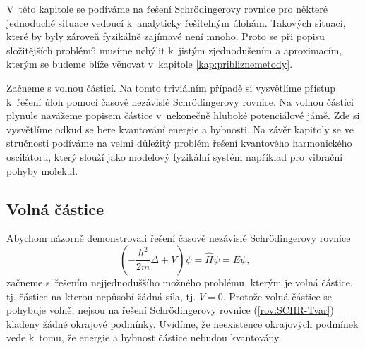 V~této kapitole se podíváme na řešení Schrödingerovy rovnice pro některé jednoduché situace vedoucí k~analyticky řešitelným úlohám. Takových situací, které by byly zároveň fyzikálně zajímavé není mnoho. Proto se při popisu složitějších problémů musíme uchýlit k~jistým zjednodušením a aproximacím, kterým se budeme blíže věnovat v~kapitole \ref{kap:pribliznemetody}.

Začneme s volnou částicí. Na tomto triviálním případě si vysvětlíme přístup k~řešení úloh pomocí časově nezávislé Schrödingerovy rovnice. Na volnou částici plynule navážeme popisem částice v~nekonečně hluboké potenciálové jámě. Zde si vysvětlíme odkud se bere kvantování energie a hybnosti. Na závěr kapitoly se ve stručnosti podíváme na velmi důležitý problém řešení kvantového harmonického oscilátoru, který slouží jako modelový fyzikální systém například pro vibrační pohyby molekul.

\subsection{Volná částice}
\label{kap:VolnaCastice}

Abychom názorně demonstrovali řešení časově nezávislé Schrödingerovy rovnice
\begin{equation}
(- \frac{\hbar^2}{2m} \Delta + V) \psi = \hat{H} \psi = E \psi \mbox{,}
\label{rov:SCHR-Tvar}
\end{equation}
začneme s~řešením nejjednoduššího možného problému, kterým je volná částice, tj. částice na kterou nepůsobí žádná síla, tj. $V = 0$. Protože volná částice se pohybuje volně, nejsou na řešení Schrödingerovy rovnice (\ref{rov:SCHR-Tvar}) kladeny žádné okrajové podmínky. Uvidíme, že neexistence okrajových podmínek vede k~tomu, že energie a hybnost částice nebudou kvantovány.

